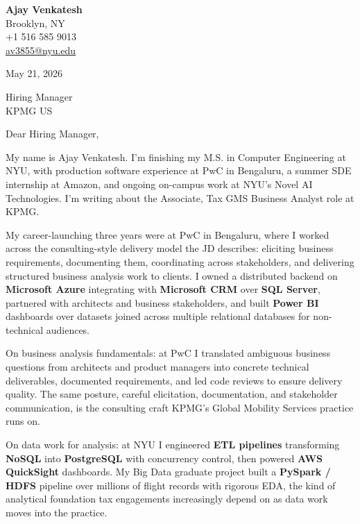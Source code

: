 \documentclass[letterpaper,11pt]{article}
\begin{document}
\begin{flushleft}
\textbf{\large Ajay Venkatesh} \\
Brooklyn, NY \\
+1 516 585 9013 \\
\href{mailto:av3855@nyu.edu}{av3855@nyu.edu}
\end{flushleft}
\vspace{10pt}
May 21, 2026
\vspace{6pt}

Hiring Manager \\
KPMG US

\vspace{10pt}

Dear Hiring Manager,

My name is Ajay Venkatesh. I'm finishing my M.S. in Computer Engineering at NYU, with production software experience at PwC in Bengaluru, a summer SDE internship at Amazon, and ongoing on-campus work at NYU's Novel AI Technologies. I'm writing about the Associate, Tax GMS Business Analyst role at KPMG.

My career-launching three years were at PwC in Bengaluru, where I worked across the consulting-style delivery model the JD describes: eliciting business requirements, documenting them, coordinating across stakeholders, and delivering structured business analysis work to clients. I owned a distributed backend on \textbf{Microsoft Azure} integrating with \textbf{Microsoft CRM} over \textbf{SQL Server}, partnered with architects and business stakeholders, and built \textbf{Power BI} dashboards over datasets joined across multiple relational databases for non-technical audiences.

On business analysis fundamentals: at PwC I translated ambiguous business questions from architects and product managers into concrete technical deliverables, documented requirements, and led code reviews to ensure delivery quality. The same posture, careful elicitation, documentation, and stakeholder communication, is the consulting craft KPMG's Global Mobility Services practice runs on.

On data work for analysis: at NYU I engineered \textbf{ETL pipelines} transforming \textbf{NoSQL} into \textbf{PostgreSQL} with concurrency control, then powered \textbf{AWS QuickSight} dashboards. My Big Data graduate project built a \textbf{PySpark / HDFS} pipeline over millions of flight records with rigorous EDA, the kind of analytical foundation tax engagements increasingly depend on as data work moves into the practice.
\end{document}
